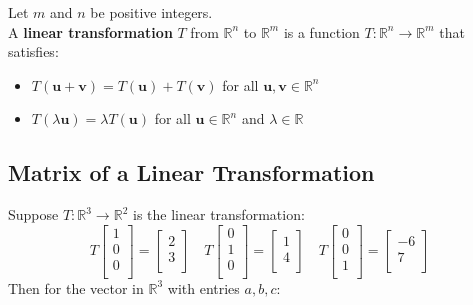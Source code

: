 \documentclass[a4paper, 9pt]{extarticle}
\begin{document}
Let $m$ and $n$ be positive integers. \\[2ex]
A \textbf{linear transformation} $T$ from $\mathbb{R}^n$ to $\mathbb{R}^m$ is a function $T:\mathbb{R}^n \to \mathbb{R}^m$ that satisfies:
\begin{itemize}
  \item $T(\textbf{u} + \textbf{v}) = T(\textbf{u}) + T(\textbf{v})$ for all $\textbf{u}, \textbf{v} \in \mathbb{R}^n$
  \item $T(\lambda\textbf{u}) = \lambda T(\textbf{u})$ for all $\textbf{u} \in \mathbb{R}^n$ and $\lambda \in \mathbb{R}$
\end{itemize}

\subsection*{Matrix of a Linear Transformation}
Suppose $T:\mathbb{R}^3 \to \mathbb{R}^2$ is the linear transformation:
$$
  T\begin{bmatrix}
    1 \\
    0 \\
    0 \\
  \end{bmatrix}
  = \begin{bmatrix}
    2 \\
    3 \\
  \end{bmatrix}
  \quad
  T\begin{bmatrix}
    0 \\
    1 \\
    0 \\
  \end{bmatrix}
  = \begin{bmatrix}
    1 \\
    4 \\
  \end{bmatrix}
  \quad
  T\begin{bmatrix}
    0 \\
    0 \\
    1 \\
  \end{bmatrix}
  = \begin{bmatrix}
    -6 \\
    7  \\
  \end{bmatrix}
$$
Then for the vector in $\mathbb{R}^3$ with entries $a,b,c$:
\end{document}
